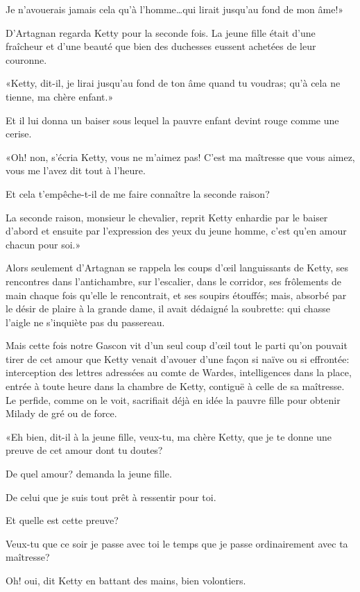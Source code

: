 \speak  Je n'avouerais jamais cela qu'à l'homme\dots qui lirait jusqu'au fond de mon âme!» 

D'Artagnan regarda Ketty pour la seconde fois. La jeune fille était d'une fraîcheur et d'une beauté que bien des duchesses eussent achetées de leur couronne. 

«Ketty, dit-il, je lirai jusqu'au fond de ton âme quand tu voudras; qu'à cela ne tienne, ma chère enfant.» 

Et il lui donna un baiser sous lequel la pauvre enfant devint rouge comme une cerise. 

«Oh! non, s'écria Ketty, vous ne m'aimez pas! C'est ma maîtresse que vous aimez, vous me l'avez dit tout à l'heure. 

\speak  Et cela t'empêche-t-il de me faire connaître la seconde raison? 

\speak  La seconde raison, monsieur le chevalier, reprit Ketty enhardie par le baiser d'abord et ensuite par l'expression des yeux du jeune homme, c'est qu'en amour chacun pour soi.» 

Alors seulement d'Artagnan se rappela les coups d'œil languissants de Ketty, ses rencontres dans l'antichambre, sur l'escalier, dans le corridor, ses frôlements de main chaque fois qu'elle le rencontrait, et ses soupirs étouffés; mais, absorbé par le désir de plaire à la grande dame, il avait dédaigné la soubrette: qui chasse l'aigle ne s'inquiète pas du passereau. 

Mais cette fois notre Gascon vit d'un seul coup d'œil tout le parti qu'on pouvait tirer de cet amour que Ketty venait d'avouer d'une façon si naïve ou si effrontée: interception des lettres adressées au comte de Wardes, intelligences dans la place, entrée à toute heure dans la chambre de Ketty, contiguë à celle de sa maîtresse. Le perfide, comme on le voit, sacrifiait déjà en idée la pauvre fille pour obtenir Milady de gré ou de force. 

«Eh bien, dit-il à la jeune fille, veux-tu, ma chère Ketty, que je te donne une preuve de cet amour dont tu doutes? 

\speak  De quel amour? demanda la jeune fille. 

\speak  De celui que je suis tout prêt à ressentir pour toi. 

\speak  Et quelle est cette preuve? 

\speak  Veux-tu que ce soir je passe avec toi le temps que je passe ordinairement avec ta maîtresse? 

\speak  Oh! oui, dit Ketty en battant des mains, bien volontiers. 

